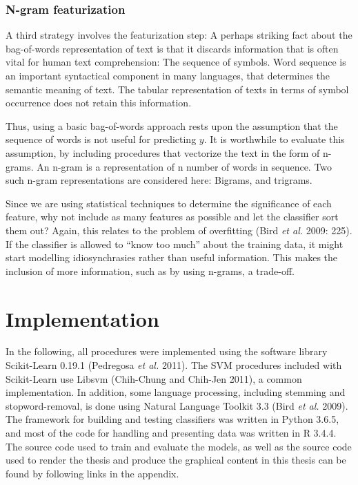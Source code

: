 \documentclass[12pt,twoside]{reedthesis}
\begin{document}
\subsubsection{N-gram featurization}\label{n-gram-featurization}

A third strategy involves the featurization step: A perhaps striking
fact about the bag-of-words representation of text is that it discards
information that is often vital for human text comprehension: The
sequence of symbols. Word sequence is an important syntactical component
in many languages, that determines the semantic meaning of text. The
tabular representation of texts in terms of symbol occurrence does not
retain this information.

Thus, using a basic bag-of-words approach rests upon the assumption that
the sequence of words is not useful for predicting \(y\). It is
worthwhile to evaluate this assumption, by including procedures that
vectorize the text in the form of n-grams. An n-gram is a representation
of n number of words in sequence. Two such n-gram representations are
considered here: Bigrams, and trigrams.

Since we are using statistical techniques to determine the significance
of each feature, why not include as many features as possible and let
the classifier sort them out? Again, this relates to the problem of
overfitting (Bird \emph{et al.} 2009: 225). If the classifier is allowed
to ``know too much'' about the training data, it might start modelling
idiosynchrasies rather than useful information. This makes the inclusion
of more information, such as by using n-grams, a trade-off.

\section{Implementation}\label{implementation}

In the following, all procedures were implemented using the software
library Scikit-Learn 0.19.1 (Pedregosa \emph{et al.} 2011). The SVM
procedures included with Scikit-Learn use Libsvm (Chih-Chung and
Chih-Jen 2011), a common implementation. In addition, some language
processing, including stemming and stopword-removal, is done using
Natural Language Toolkit 3.3 (Bird \emph{et al.} 2009). The framework
for building and testing classifiers was written in Python 3.6.5, and
most of the code for handling and presenting data was written in R
3.4.4. The source code used to train and evaluate the models, as well as
the source code used to render the thesis and produce the graphical
content in this thesis can be found by following links in the appendix.
\end{document}
